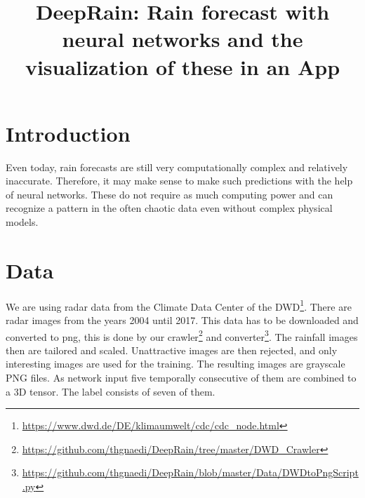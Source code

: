 \documentclass[oneside]{htwg-report}
\begin{document}



\newcommand{\verfasserA}{Simon Christofzik}
\newcommand{\verfasserB}{Paul Sutter}
\newcommand{\verfasserC}{Till Reitlinger}
\newcommand{\thema}{DeepRain: Rain forecast with neural networks and the visualization of these in an App}
\newcommand{\hoschschule}{HTWG Konstanz - University of Applied Sciences}
\newcommand{\institut}{HTWG Konstanz - Institute for Optical Systems}
\newcommand{\prueferA}{Prof. Dr. Oliver Dürr}


\title[Teamprojektthema]{\thema}


\makecover[]


\twocolumn
\section*{Introduction}

\begin{sloppypar}
Even today, rain forecasts are still very computationally complex and relatively inaccurate. 
Therefore, it may make sense to make such predictions with the help of neural networks. 
These do not require as much computing power and can recognize a pattern in the often chaotic data even without complex physical models.
\end{sloppypar}

\section*{Data}
We are using radar data from the Climate Data Center of the DWD\footnote{\url{https://www.dwd.de/DE/klimaumwelt/cdc/cdc_node.html}}. There are radar images from the years 2004 until 2017.
This data has to be downloaded and converted to png, this is done by our crawler\footnote{\url{https://github.com/thgnaedi/DeepRain/tree/master/DWD_Crawler}} and converter\footnote{\url{https://github.com/thgnaedi/DeepRain/blob/master/Data/DWDtoPngScript.py}}.
The rainfall images then are tailored and scaled. Unattractive images are then rejected, and only interesting images are used for the training.
The resulting images are grayscale PNG files. As network input five temporally consecutive of them are combined to a 3D tensor. The label consists of seven of them.
\end{document}

